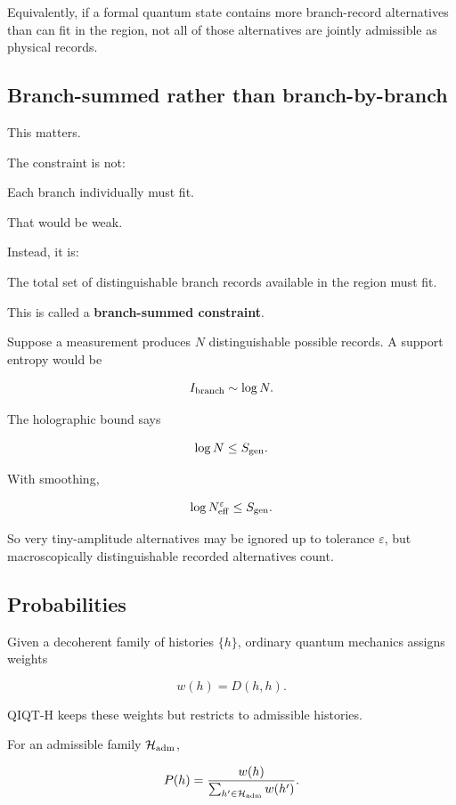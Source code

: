 \documentclass[11pt,a4paper]{article}
\newenvironment{qiqtquote}{\begin{mdframed}[style=quotestyle]}{\end{mdframed}}
\begin{document}
Equivalently, if a formal quantum state contains more branch-record alternatives than can fit in the region, not all of those alternatives are jointly admissible as physical records.

\subsection{Branch-summed rather than branch-by-branch}

This matters.

The constraint is not:

\begin{qiqtquote}
Each branch individually must fit.
\end{qiqtquote}

That would be weak.

Instead, it is:

\begin{qiqtquote}
The total set of distinguishable branch records available in the region must fit.
\end{qiqtquote}

This is called a \textbf{branch-summed constraint}.

Suppose a measurement produces $N$ distinguishable possible records. A support entropy would be

\[
I_{\rm branch}\sim \log N.
\]

The holographic bound says

\[
\log N \leq S_{\rm gen}.
\]

With smoothing,

\[
\log N^\varepsilon_{\rm eff}\leq S_{\rm gen}.
\]

So very tiny-amplitude alternatives may be ignored up to tolerance $\varepsilon$, but macroscopically distinguishable recorded alternatives count.

\subsection{Probabilities}

Given a decoherent family of histories $\{h\}$, ordinary quantum mechanics assigns weights

\[
w(h)=D(h,h).
\]

QIQT-H keeps these weights but restricts to admissible histories.

For an admissible family $\mathcal{H}_{\rm adm}$,

\[
P(h)
=
\frac{w(h)}{\sum_{h'\in \mathcal{H}_{\rm adm}} w(h')}.
\]
\end{document}
